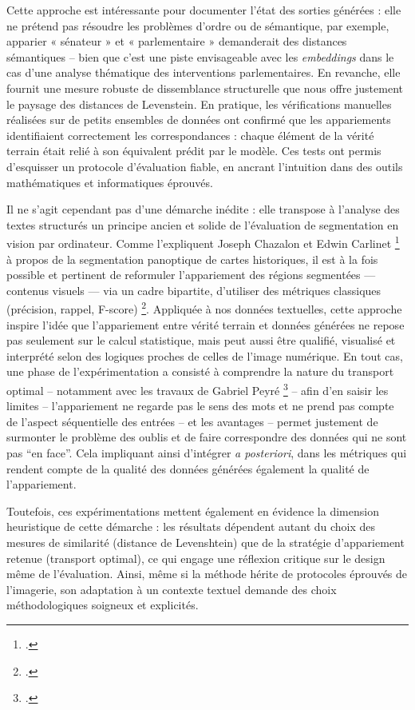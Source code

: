 Cette approche est intéressante pour documenter l’état des sorties générées : elle ne prétend pas résoudre les problèmes d’ordre ou de sémantique, par exemple, apparier « sénateur » et « parlementaire » demanderait des distances sémantiques -- bien que c'est une piste envisageable avec les \emph{embeddings} dans le cas d'une analyse thématique des interventions parlementaires. En revanche, elle fournit une mesure robuste de dissemblance structurelle que nous offre justement le paysage des distances de Levenstein. En pratique, les vérifications manuelles réalisées sur de petits ensembles de données ont confirmé que les appariements identifiaient correctement les correspondances : chaque élément de la vérité terrain était relié à son équivalent prédit par le modèle. Ces tests ont permis d’esquisser un protocole d’évaluation fiable, en ancrant l’intuition dans des outils mathématiques et informatiques éprouvés.

Il ne s’agit cependant pas d’une démarche inédite : elle transpose à l’analyse des textes structurés un principe ancien et solide de l’évaluation de segmentation en vision par ordinateur. Comme l’expliquent Joseph Chazalon et Edwin Carlinet \footcite[][]{chazalon} à propos de la segmentation panoptique de cartes historiques, il est à la fois possible et pertinent de reformuler l’appariement des régions segmentées — contenus visuels — via un cadre bipartite, d’utiliser des métriques classiques (précision, rappel, F-score) \footcite[][]{chazalon}. Appliquée à nos données textuelles, cette approche inspire l’idée que l’appariement entre vérité terrain et données générées ne repose pas seulement sur le calcul statistique, mais peut aussi être qualifié, visualisé et interprété selon des logiques proches de celles de l’image numérique. En tout cas, une phase de l'expérimentation a consisté à comprendre la nature du transport optimal -- notamment avec les travaux de Gabriel Peyré \footcite[][]{peyre} -- afin d'en saisir les limites -- l'appariement ne regarde pas le sens des mots et ne prend pas compte de l'aspect séquentielle des entrées -- et les avantages -- permet justement de surmonter le problème des oublis et de faire correspondre des données qui ne sont pas \enquote{en face}. Cela impliquant ainsi d'intégrer \emph{a posteriori}, dans les métriques qui rendent compte de la qualité des données générées également la qualité de l'appariement.

Toutefois, ces expérimentations mettent également en évidence la dimension heuristique de cette démarche : les résultats dépendent autant du choix des mesures de similarité (distance de Levenshtein) que de la stratégie d’appariement retenue (transport optimal), ce qui engage une réflexion critique sur le design même de l’évaluation. Ainsi, même si la méthode hérite de protocoles éprouvés de l’imagerie, son adaptation à un contexte textuel demande des choix méthodologiques soigneux et explicités.

